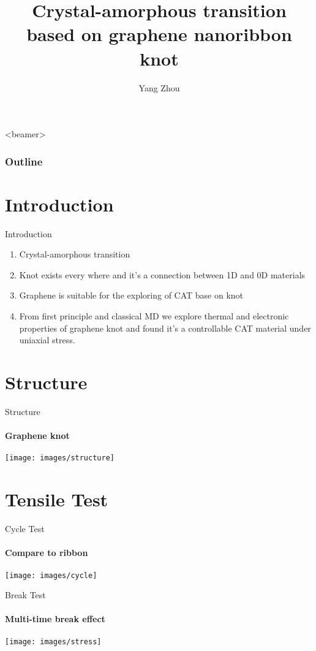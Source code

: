 \documentclass{beamer}
\title{Crystal-amorphous transition based on graphene nanoribbon knot} %
\author{Yang Zhou}
\begin{document}
\frame{
\maketitle \\
{\color{white} \today}
}


\begin{frame}<beamer>
  \frametitle{Outline} %
  \tableofcontents
\end{frame}
\section{Introduction}
\begin{frame}{Introduction}

  \begin{enumerate}
    \item Crystal-amorphous transition

    \item Knot exists every where and it’s a connection between 1D and 0D materials

    \item Graphene is suitable for the exploring of CAT base on knot
    \item From first principle and classical MD we explore thermal and electronic properties of graphene knot and found it’s a controllable CAT material under uniaxial  stress.

  \end{enumerate}
  \bigskip
  \justifying

\end{frame}


\section{Structure}
\begin{frame}{Structure}
  \framesubtitle{Graphene knot}%
  \texttt{[image: images/structure]}
\end{frame}

\section{Tensile Test}
\begin{frame}{Cycle Test}
  \framesubtitle{Compare to ribbon}%
  \texttt{[image: images/cycle]}

\end{frame}
\begin{frame}{Break Test}
  \framesubtitle{Multi-time break effect}%
  \texttt{[image: images/stress]}

\end{frame}
\end{document}
